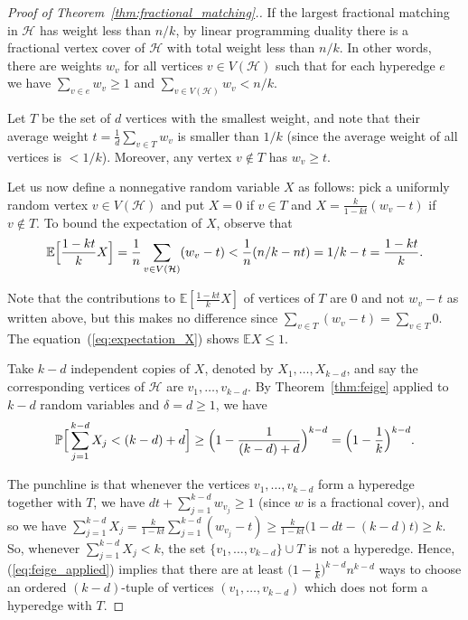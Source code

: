 \documentclass[10pt,a4paper]{article}
\newcommand{\bE}{\mathbb{E}}
\newcommand{\cH}{\mathcal{H}}
\newcommand{\Pb}{\mathbb P}
\begin{document}
\begin{proof}[Proof of Theorem~\ref{thm:fractional_matching}.]
If the largest fractional matching in $\cH$ has weight less than $n/k$, by linear programming duality there is a fractional vertex cover of $\cH$ with total weight less than $n/k$. In other words, there are weights $w_v$ for all vertices $v\in V(\cH)$ such that for each hyperedge $e$ we have $\sum_{v\in e} w_v\geq 1$ and $\sum_{v\in V(\cH)}w_v<n/k$.

Let $T$ be the set of $d$ vertices with the smallest weight, and note that their average weight $t=\frac{1}{d}\sum_{v\in T}w_v$ is smaller than $1/k$ (since the average weight of all vertices is $<1/k$). Moreover, any vertex $v\notin T$ has $w_v\geq t$. 

Let us now define a nonnegative random variable $X$ as follows: pick a uniformly random vertex $v\in V(\cH)$ and put $X=0$ if $v\in T$ and $X=\frac{k}{1-kt}(w_v-t)$ if $v\notin T$. To bound the expectation of $X$, observe that
\vspace{-0.2cm}
\begin{equation}\label{eq:expectation_X}
    \bE\Big[\frac{1-kt}{k}X\Big]=\frac{1}{n}\sum_{v\in V(\cH)}(w_v-t)<\frac{1}{n}(n/k-nt)=1/k-t= \frac{1-kt}{k}.\vspace{-0.2cm}
\end{equation}


Note that the contributions to $\bE[\frac{1-kt}{k}X]$ of vertices of $T$ are $0$ and not $w_v-t$ as written above, but this makes no difference since $\sum_{v\in T}(w_v-t)=\sum_{v\in T}0$. The equation~(\ref{eq:expectation_X}) shows $\bE X\leq 1$.

Take $k-d$ independent copies of $X$, denoted by $X_1, \dots, X_{k-d}$, and say the corresponding vertices of $\cH$ are $v_1, \dots, v_{k-d}$. By Theorem~\ref{thm:feige} applied to $k-d$ random variables and $\delta=d\geq 1$, we have 
\vspace{-0.2cm}
\begin{equation}\label{eq:feige_applied}
\Pb\Big[\sum_{j=1}^{k-d} X_j< (k-d)+d\Big]\geq \Big(1-\frac{1}{(k-d)+d}\Big)^{k-d}=\Big(1-\frac{1}{k}\Big)^{k-d}.\vspace{-0.2cm}
\end{equation}
\vspace{-0.2cm}

The punchline is that whenever the vertices $v_1, \dots, v_{k-d}$ form a hyperedge together with $T$, we have $dt+\sum_{j=1}^{k-d}w_{v_j}\geq 1$ (since $w$ is a fractional cover), and so we have $\sum_{j=1}^{k-d} X_j=\frac{k}{1-kt}\sum_{j=1}^{k-d}(w_{v_j}-t)\geq \frac{k}{1-kt}\big(1-dt-(k-d)t\big)\geq k$. So, whenever $\sum_{j=1}^{k-d} X_j<k$, the set $\{v_{1}, \dots, v_{k-d}\}\cup T$ is not a hyperedge. Hence, (\ref{eq:feige_applied}) implies that there are at least $\big(1-\frac{1}{k}\big)^{k-d}n^{k-d}$ ways to choose an ordered $(k-d)$-tuple of vertices $(v_1, \dots, v_{k-d})$ which does not form a hyperedge with $T$. 


\end{proof}
\end{document}
